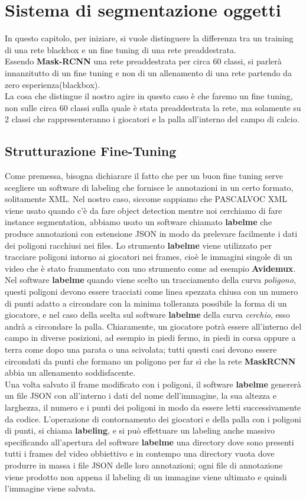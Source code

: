 \chapter{Sistema di segmentazione oggetti}
\label{chap:preparation}
In questo capitolo, per iniziare, si vuole distinguere la differenza tra un training di una rete blackbox e un fine tuning di una rete preaddestrata.\\
Essendo \textbf{Mask-RCNN} una rete preaddestrata per circa 60 classi, si parlerà innanzitutto di un fine tuning e non di un allenamento di una rete partendo da zero esperienza(blackbox).\\
La cosa che distingue il nostro agire in questo caso è che faremo un fine tuning, non sulle circa 60 classi sulla quale è stata preaddestrata la rete, ma solamente su 2 classi che rappresenteranno i giocatori e la palla all'interno del campo di calcio.
\newpage
\section{Strutturazione Fine-Tuning}
Come premessa, bisogna dichiarare il fatto che per un buon fine tuning serve scegliere un software di labeling che fornisce le annotazioni in un certo formato, solitamente XML.
Nel nostro caso, siccome sappiamo che PASCALVOC XML viene usato quando c'è da fare object detection mentre noi cerchiamo di fare instance segmentation, abbiamo usato un software chiamato \textbf{labelme} che produce annotazioni con estensione JSON in modo da prelevare facilmente i dati dei poligoni racchiusi nei files.
Lo strumento \textbf{labelme} viene utilizzato per tracciare poligoni intorno ai giocatori nei frames, cioè le immagini singole di un video che è stato frammentato con uno strumento come ad esempio \textbf{Avidemux}. \\
Nel software \textbf{labelme} quando viene scelto un tracciamento della curva \emph{poligono}, questi poligoni devono essere tracciati come linea spezzata chiusa con un numero di punti adatto a circondare con la minima tolleranza possibile la forma di un giocatore, e nel caso della scelta sul software \textbf{labelme} della curva \emph{cerchio}, esso andrà a circondare la palla.
Chiaramente, un giocatore potrà essere all'interno del campo in diverse posizioni, ad esempio in piedi fermo, in piedi in corsa oppure a terra come dopo una parata o una scivolata; tutti questi casi devono essere circondati da punti che formano un poligono per far sì che la rete \textbf{MaskRCNN} abbia un allenamento soddisfacente.\\
Una volta salvato il frame modificato con i poligoni, il software \textbf{labelme} genererà un file JSON con all'interno i dati del nome dell'immagine, la sua altezza e larghezza, il numero e i punti dei poligoni in modo da essere letti successivamente da codice.
L'operazione di contornamento dei giocatori e della palla con i poligoni di punti, si chiama \textbf{labeling}, e si può effettuare un labeling anche massivo specificando all'apertura del software \textbf{labelme}  una directory dove sono presenti tutti i frames del video obbiettivo e in contempo una directory vuota dove produrre in massa i file JSON delle loro annotazioni; ogni file di annotazione viene prodotto non appena il labeling di un immagine viene ultimato e quindi l'immagine viene salvata.